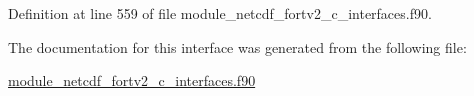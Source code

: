 Definition at line 559 of file module\+\_\+netcdf\+\_\+fortv2\+\_\+c\+\_\+interfaces.\+f90.



The documentation for this interface was generated from the following file\+:\begin{DoxyCompactItemize}
\item 
\hyperlink{module__netcdf__fortv2__c__interfaces_8f90}{module\+\_\+netcdf\+\_\+fortv2\+\_\+c\+\_\+interfaces.\+f90}\end{DoxyCompactItemize}

